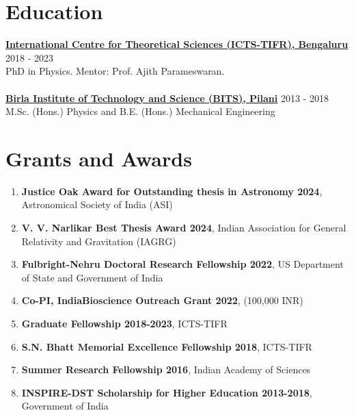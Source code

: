 			
		
		\section{Education}
		\textbf{\href{https://www.icts.res.in/}{International Centre for Theoretical Sciences (ICTS-TIFR), Bengaluru}} \hfill 2018 - 2023\\
            PhD in Physics. {Mentor: Prof. Ajith Parameswaran}.\\
             \\
            \textbf{\href{http://www.bits-pilani.ac.in/}{Birla Institute of Technology and Science (BITS), Pilani}} \hfill 2013 - 2018\\
		{M.Sc. (Hons.) Physics and B.E. (Hons.) Mechanical Engineering}

	\section{Grants and Awards}
		\begin{enumerate}[leftmargin=*]
            \item \textbf{Justice Oak Award for Outstanding thesis in Astronomy 2024}, Astronomical Society of India (ASI)
            \item \textbf{V. V. Narlikar Best Thesis Award 2024}, {Indian Association for General Relativity and Gravitation (IAGRG)}
			\item  \textbf{Fulbright-Nehru Doctoral Research Fellowship 2022}, US Department of State and Government of India
            \item \textbf{Co-PI, IndiaBioscience Outreach Grant 2022},  (100,000 INR)
			\item \textbf{Graduate Fellowship 2018-2023}, ICTS-TIFR
			\item \textbf{S.N. Bhatt Memorial Excellence Fellowship 2018}, ICTS-TIFR
			\item \textbf{Summer Research Fellowship 2016},  Indian Academy of Sciences
			\item \textbf{INSPIRE-DST Scholarship for Higher Education 2013-2018}, Government of India
		\end{enumerate}

